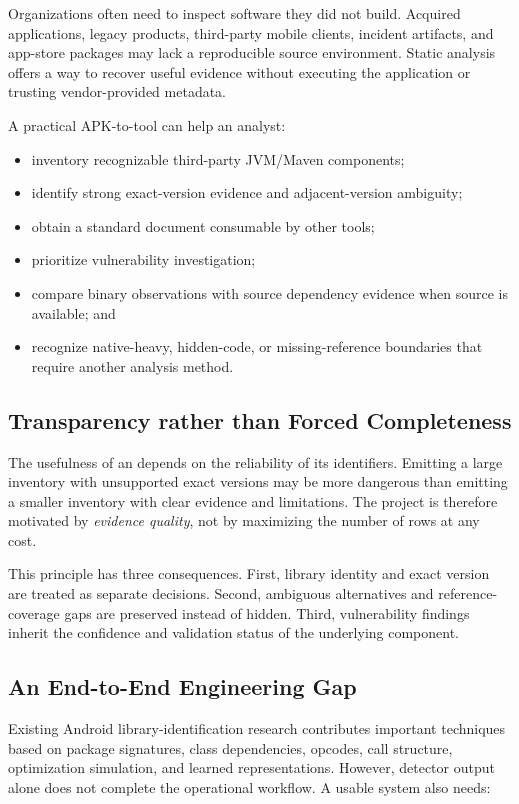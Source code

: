 Organizations often need to inspect software they did not build. Acquired
applications, legacy products, third-party mobile clients, incident artifacts,
and app-store packages may lack a reproducible source environment. Static
\APK analysis offers a way to recover useful evidence without executing the
application or trusting vendor-provided metadata.

A practical APK-to-\SBOM tool can help an analyst:

\begin{itemize}
  \item inventory recognizable third-party JVM/Maven components;
  \item identify strong exact-version evidence and adjacent-version
  ambiguity;
  \item obtain a standard document consumable by other tools;
  \item prioritize vulnerability investigation;
  \item compare binary observations with source dependency evidence when
  source is available; and
  \item recognize native-heavy, hidden-code, or missing-reference boundaries
  that require another analysis method.
\end{itemize}

\subsection{Transparency rather than Forced Completeness}

The usefulness of an \SBOM depends on the reliability of its identifiers.
Emitting a large inventory with unsupported exact versions may be more
dangerous than emitting a smaller inventory with clear evidence and
limitations. The project is therefore motivated by \emph{evidence quality},
not by maximizing the number of rows at any cost.

This principle has three consequences. First, library identity and exact
version are treated as separate decisions. Second, ambiguous alternatives and
reference-coverage gaps are preserved instead of hidden. Third,
vulnerability findings inherit the confidence and validation status of the
underlying component.

\subsection{An End-to-End Engineering Gap}

Existing Android library-identification research contributes important
techniques based on package signatures, class dependencies, opcodes, call
structure, optimization simulation, and learned representations. However,
detector output alone does not complete the operational workflow. A usable
system also needs:

